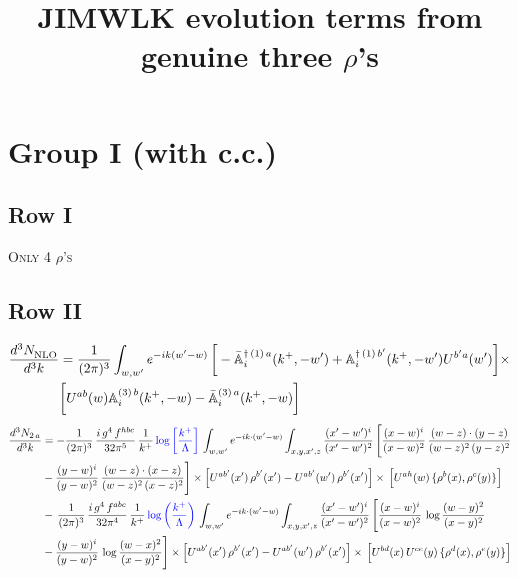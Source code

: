\documentclass[9pt]{article}
\title{JIMWLK evolution terms from genuine three $\rho$'s}
\author{}
\date{}
\def\mf#1{\mathbb{#1}}
\numberwithin{equation}{section}
\begin{document}
\par


\maketitle
\section{Group I (with c.c.)}
\subsection{Row I}
\textsc{Only 4 $\rho$'s}
\subsection{Row II}
\begin{align}
    \frac{d^{3}N_{\rm NLO}^{\rm}}{d^{3}k} &  = \frac{1}{(2\pi)^{3}}  \int_{w, w^\prime} e^{-ik(w^\prime-w)}\,\bigg[-\bar{\mf{A}}^{\dagger\,(1)\,a}_{i}(k^{+},-w^{\prime})+\mf{A}^{\dagger\, (1)\, b^{\prime}}_{i}(k^{+},-w^{\prime})U^{b^{\prime}a}(w^{\prime})\bigg]\times \notag \\ & \bigg[U^{ab}(w)\mf{A}^{(3)\, b}_{i}(k^{+},- w)-\Bar{\mf{A}}^{(3)\, a}_{i}(k^{+}, - w)\bigg]\nonumber
\end{align}
\begin{align}
    \frac{d^{3}N_{2\,a}}{d^{3}k} & = -\frac{1}{(2\pi)^{3}}\,\frac{i\,g^{4}\,f^{hbc}}{32\pi^{5}}\,\frac{1}{k^{+}}\,{\color{blue}\log{\left[\frac{k^{+}}{\Lambda}\right]}}\,
\int_{w,w'} e^{-ik\cdot(w'-w)}\int_{x,y,x',z}\frac{(x'-w')^{i}}{(x'-w')^{2}}\,\Bigg[\frac{(x-w)^{i}}{(x-w)^{2}}\, \frac{(w-z)\cdot (y-z)}{(w-z)^{2}\,(y-z)^{2}}\notag \\ & - \frac{(y-w)^{i}}{(y-w)^{2}}\, \frac{(w-z)\cdot (x-z)}{(w-z)^{2}\,(x-z)^{2}}\Bigg]\times\Big[U^{ab'}(x')\,\rho^{b'}(x')-U^{ab'}(w')\,\rho^{b'}(x')\Big]\times\, \Big[U^{ah}(w)\,\{\rho^{b}(x),\rho^{c}(y)\}\Big]\notag \\ &  -\,\frac{1}{(2\pi)^{3}}\,\frac{i\,g^{4}\,f^{abc}}{32\pi^{4}}\,\frac{1}{k^{+}}\,{\color{blue}\log\left(\frac{k^{+}}{\Lambda}\right)}\,
\int_{w,w'} e^{-ik\cdot(w'-w)}\int_{x,y,x',z}\frac{(x'-w')^{i}}{(x'-w')^{2}}\,\Bigg[\frac{(x-w)^{i}}{(x-w)^{2}}\,\log\frac{(w-y)^{2}}{(x-y)^{2}}\notag \\ & -\frac{(y-w)^{i}}{(y-w)^{2}}\,\log\frac{(w-x)^{2}}{(x-y)^{2}}\Bigg]\times \Big[U^{ab'}(x')\,\rho^{b'}(x')-U^{ab'}(w')\,\rho^{b'}(x')\Big]\times\, \Big[U^{bd}(x)\,U^{ce}(y)\,\{\rho^{d}(x),\rho^{e}(y)\}\Big]
\end{align}
\end{document}
